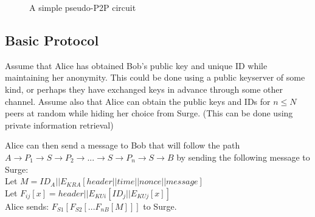 \documentclass[twocolumn,11pt,english]{article}
\begin{document}
\begin{figure}[ht]
  \begin{center}
  \end{center}
  \caption{A simple pseudo-P2P circuit}
\end{figure}


\subsection{Basic Protocol}
Assume that Alice has obtained Bob's public key and unique ID while maintaining her anonymity. This could be done using a public keyserver of some kind, or perhaps they have exchanged keys in advance through some other channel. Assume also that Alice can obtain the public keys and IDs for $n \le N$ peers at random while hiding her choice from Surge. (This can be done using private information retrieval)

Alice can then send a message to Bob that will follow the path $A \rightarrow P_1 \rightarrow S \rightarrow P_2 \rightarrow ... \rightarrow S \rightarrow P_n \rightarrow S \rightarrow B$ by sending the following message to Surge: 
\\
Let \scriptsize$M = ID_A||E_{KRA}[ header || time || nonce || message ]$
\normalsize
\\Let \scriptsize$F_{ij}[x] = header||E_{KUi}[ ID_j || E_{KUj}[ x ] ]$
\normalsize
\\
Alice sends: $F_{S1}[F_{S2}[...F_{nB}[ M ]]]$ to Surge. 
\end{document}
